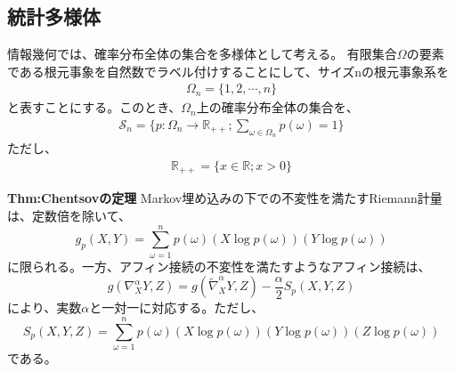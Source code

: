 \documentclass[a4paper,11pt]{jsarticle}
\numberwithin{equation}{section}
\begin{document}
\subsection{統計多様体}
情報幾何では、確率分布全体の集合を多様体として考える。
有限集合$\Omega$の要素である根元事象を自然数でラベル付けすることにして、サイズnの根元事象系を
\begin{align}
    \Omega_n = \{1,2,\cdots,n\}
\end{align}
と表すことにする。このとき、$\Omega_n$上の確率分布全体の集合を、
\begin{align}
    \mathcal{S}_n = \{p: \Omega_n \to \mathbb{R}_{++}; \sum_{\omega \in \Omega_n} p(\omega) = 1\}
\end{align}
ただし、
\begin{align}
    \mathbb{R}_{++} = \{x \in \mathbb{R}; x > 0\}
\end{align}



\begin{itembox}[l]{\textbf{Thm:Chentsovの定理}}
    Markov埋め込みの下での不変性を満たすRiemann計量は、定数倍を除いて、
    \begin{equation}
        \label{eq:Fisher1}
        g_p(X,Y) = \sum_{\omega = 1}^{n} p(\omega) (X\log p(\omega))(Y\log p(\omega))
    \end{equation}
    に限られる。一方、アフィン接続の不変性を満たすようなアフィン接続は、
    \begin{equation}    
        \label{eq:Fisher2}
        g(\nabla_X^{\alpha} Y,Z) = g(\tilde{\nabla}_X^{\alpha} Y,Z) - \frac{\alpha}{2} S_p(X,Y,Z)
    \end{equation}
    により、実数$\alpha$と一対一に対応する。ただし、
    \begin{equation}
        S_p(X,Y,Z) = \sum_{\omega = 1}^{n} p(\omega) (X\log p(\omega))(Y\log p(\omega))(Z\log p(\omega))
    \end{equation}
    である。
\end{itembox}
\end{document}
